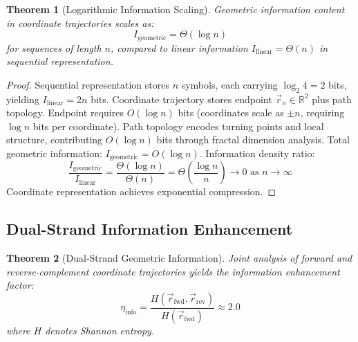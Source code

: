 \documentclass[11pt,a4paper]{article}
\newtheorem{theorem}{Theorem}[section]
\theoremstyle{remark}
\begin{document}
\begin{theorem}[Logarithmic Information Scaling]
\label{thm:log_info_scaling}
Geometric information content in coordinate trajectories scales as:
\begin{equation}
I_{\text{geometric}} = \Theta(\log n)
\end{equation}
for sequences of length $n$, compared to linear information $I_{\text{linear}} = \Theta(n)$ in sequential representation.
\end{theorem}

\begin{proof}
Sequential representation stores $n$ symbols, each carrying $\log_2 4 = 2$ bits, yielding $I_{\text{linear}} = 2n$ bits. Coordinate trajectory stores endpoint $\vec{r}_n \in \mathbb{R}^2$ plus path topology. Endpoint requires $O(\log n)$ bits (coordinates scale as $\pm n$, requiring $\log n$ bits per coordinate). Path topology encodes turning points and local structure, contributing $O(\log n)$ bits through fractal dimension analysis. Total geometric information: $I_{\text{geometric}} = O(\log n)$. Information density ratio:
\begin{equation}
\frac{I_{\text{geometric}}}{I_{\text{linear}}} = \frac{\Theta(\log n)}{\Theta(n)} = \Theta\left(\frac{\log n}{n}\right) \to 0 \text{ as } n \to \infty
\end{equation}
Coordinate representation achieves exponential compression.
\end{proof}

\subsection{Dual-Strand Information Enhancement}

\begin{theorem}[Dual-Strand Geometric Information]
\label{thm:dual_strand_info}
Joint analysis of forward and reverse-complement coordinate trajectories yields the information enhancement factor:
\begin{equation}
\eta_{\text{info}} = \frac{H(\vec{r}_{\text{fwd}}, \vec{r}_{\text{rev}})}{H(\vec{r}_{\text{fwd}})} \approx 2.0
\end{equation}
where $H$ denotes Shannon entropy.
\end{theorem}
\end{document}
